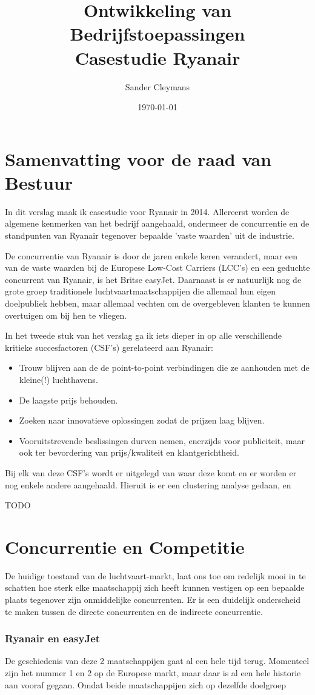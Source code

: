 \documentclass{article}
\author{Sander Cleymans}
\date{\today}
\title{Ontwikkeling van Bedrijfstoepassingen \\
		Casestudie Ryanair}
\begin{document}
 
\maketitle
\newpage  

\tableofcontents



\newpage
\part{Samenvatting voor de raad van Bestuur}

In dit verslag maak ik casestudie voor Ryanair in 2014.
Allereerst worden de algemene kenmerken van het bedrijf aangehaald, ondermeer de concurrentie en de standpunten van Ryanair tegenover bepaalde 'vaste waarden' uit de industrie.
   
De concurrentie van Ryanair is door de jaren enkele keren verandert, maar een van de vaste waarden bij de Europese Low-Cost Carriers (LCC's) en een geduchte concurrent van Ryanair, is het Britse easyJet. Daarnaast is er natuurlijk nog de grote groep traditionele luchtvaartmaatschappijen die allemaal hun eigen doelpubliek hebben, maar allemaal vechten om de overgebleven klanten te kunnen overtuigen om bij hen te vliegen.
	
In het tweede stuk van het verslag ga ik iets dieper in op alle verschillende kritieke succesfactoren (CSF's) gerelateerd aan Ryanair:
\begin{itemize}
\item Trouw blijven aan de de point-to-point verbindingen die ze aanhouden met de kleine(!) luchthavens.
\item De laagste prijs behouden.
\item Zoeken naar innovatieve oplossingen zodat de prijzen laag blijven.
\item Vooruitstrevende beslissingen durven nemen, enerzijds voor publiciteit, maar ook ter bevordering van prijs/kwaliteit en klantgerichtheid.
\end{itemize}

Bij elk van deze CSF's wordt er uitgelegd van waar deze komt en er worden er nog enkele andere aangehaald.
Hieruit is er een clustering analyse gedaan, en 

TODO
\newpage
\part{Concurrentie en Competitie}

De huidige toestand van de luchtvaart-markt, laat ons toe om redelijk mooi in te schatten hoe sterk elke maatschappij zich heeft kunnen vestigen op een bepaalde plaats tegenover zijn onmiddelijke concurrenten.
Er is een duidelijk onderscheid te maken tussen de directe concurrenten en de indirecte concurrentie.

\section{Ryanair en easyJet}

De geschiedenis van deze 2 maatschappijen gaat al een hele tijd terug. Momenteel zijn het nummer 1 en 2 op de Europese markt, maar daar is al een hele historie aan vooraf gegaan. Omdat beide maatschappijen zich op dezelfde doelgroep 
\end{document}
